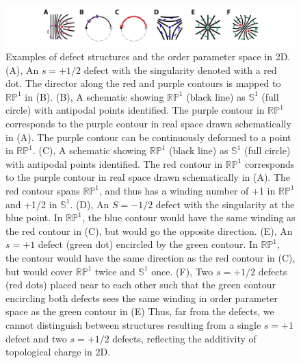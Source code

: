 \begin{figure}[h]
  \centering
  \includegraphics{figures/C2/Ch2-Figs_2DMeas.png}
  \caption{Examples of defect structures and the order parameter space in 2D.
  (A), An $s=+1/2$ defect with the singularity denoted with a red dot.
  The director along the red and purple contours is mapped to $\mathbb{R}\mathbb{P}^1$ in (B).
  (B), A schematic showing $\mathbb{R}\mathbb{P}^1$ (black line) as $\mathbb{S}^1$ (full circle) with antipodal points identified.
  The purple contour in $\mathbb{R}\mathbb{P}^1$ corresponds to the purple contour in real space drawn schematically in (A).
  The purple contour can be continuously deformed to a point in $\mathbb{R}\mathbb{P}^1$.
  (C), A schematic showing $\mathbb{R}\mathbb{P}^1$ (black line) as $\mathbb{S}^1$ (full circle) with antipodal points identified.
  The red contour in $\mathbb{R}\mathbb{P}^1$ corresponds to the purple contour in real space drawn schematically in (A).
  The red contour spans $\mathbb{RP}^1$, and thus has a winding number of +1 in $\mathbb{R}\mathbb{P}^1$ and +1/2 in $\mathbb{S}^1$.
  (D), An $S = -1/2$ defect with the singularity at the blue point.
  In $\mathbb{R}\mathbb{P}^1$, the blue contour would have the same winding as the red contour in (C), but would go the opposite direction.
  (E), An $s = +1$ defect (green dot) encircled by the green contour.
  In $\mathbb{R}\mathbb{P}^1$, the contour would have the same direction as the red contour in (C), but would cover $\mathbb{R}\mathbb{P}^1$ twice and $\mathbb{S}^1$ once.
  (F), Two $s = +1/2$ defects (red dots) placed near to each other such that the green contour encircling both defects sees the same winding in order parameter space as the green contour in (E)
  Thus, far from the defects, we cannot distinguish between structures resulting from a single $s = +1$ defect and two $s = +1/2$ defects, reflecting the additivity of topological charge in 2D.}\label{f:2-2DMeas}
\end{figure}

